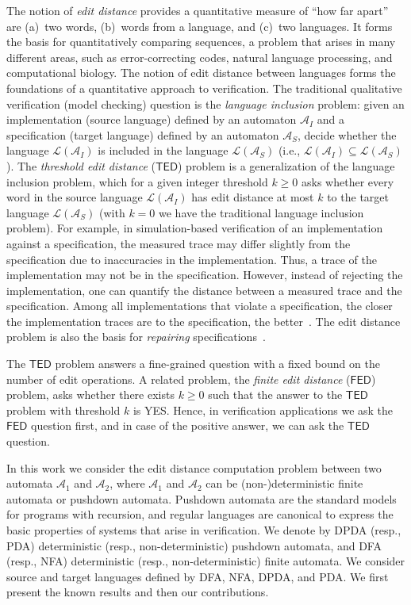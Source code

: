 \documentclass{CSML}
\newcommand{\aut}{\mathcal{A}}
\newcommand{\TED}{\mathsf{TED}}
\newcommand{\FED}{\mathsf{FED}}
\newcommand{\lang}{\mathcal{L}}
\begin{document}
\smallskip{}
The notion of {\em edit distance} provides a quantitative measure of 
``how far apart'' are (a)~two words, (b)~words from a language, and (c)~two 
languages.
It forms the basis for quantitatively comparing sequences, a problem that 
arises in many different areas, such as error-correcting codes, 
natural language processing, and computational biology.
The notion of edit distance between languages forms the foundations of a 
quantitative approach to verification.
The traditional qualitative verification (model checking) question is the 
\emph{language inclusion} problem: given an implementation (source language) 
defined by an automaton $\aut_I$ and a specification (target language) 
defined by an automaton $\aut_S$, decide whether the language 
$\lang(\aut_I)$ is included in the language $\lang(\aut_S)$ 
(i.e., $\lang(\aut_I) \subseteq \lang(\aut_S)$). 
The \emph{threshold edit distance} ($\TED$) problem is a generalization of the 
language inclusion problem, which for a given integer threshold $k\geq 0$
asks whether every word in the source language $\lang(\aut_I)$ has edit 
distance at most $k$ to the target language $\lang(\aut_S)$ 
(with $k=0$ we have the traditional language inclusion problem).
For example, in simulation-based verification of an implementation against a 
specification, the measured trace may differ slightly from the 
specification due to inaccuracies in the implementation. 
Thus, a trace of the implementation may not be in the specification. 
However, instead of rejecting the implementation, one can quantify the 
distance between a measured trace and the specification.
Among all implementations that violate a specification, the closer the 
implementation traces are to the specification, the 
better~\cite{Chatterjee08quantitativelanguages,chatterjee2012nested,ModelMeasuring}.
The edit distance problem is also the basis for {\em repairing} 
specifications~\cite{riveros,boundedRiveros}. 

The $\TED$ problem answers a fine-grained question with a fixed bound on the number of edit operations. 
A related problem, the \emph{finite edit distance} ($\FED$) problem, asks
whether there exists $k\geq0$ such that the answer to the $\TED$ problem with threshold
$k$ is YES. Hence, in verification applications we ask the $\FED$ question first, 
and in case of the positive answer, we can ask the $\TED$ question.




\smallskip{}
In this work we consider the edit distance computation problem between two 
automata $\aut_1$ and $\aut_2$, where $\aut_1$ and $\aut_2$ can be (non-)deterministic finite 
automata or pushdown automata.
Pushdown automata are the standard models for programs with recursion, 
and regular languages are canonical to express the basic properties of systems 
that arise in verification.
We denote by DPDA (resp., PDA) deterministic (resp., non-deterministic) 
pushdown automata, and DFA (resp., NFA) deterministic 
(resp., non-deterministic) finite automata.
We consider source and target languages defined by DFA, NFA, DPDA, and PDA. 
We first present the known results and then our contributions.
\end{document}

